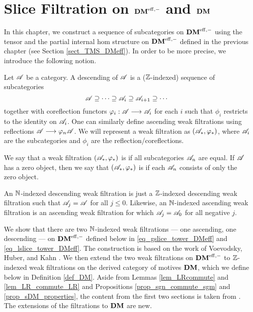 \newpage
\chapter{Slice Filtration on $\mathbf{DM}^{\mathrm{eff},-}$ and $\mathbf{DM}$}\label{sect_slice_filt_dm}

In this chapter, we construct a sequence of subcategories on 
$\mathbf{DM}^{\mathrm{eff},-}$ using the tensor and the partial internal hom structure 
on $\mathbf{DM}^{\mathrm{eff},-}$ defined in the previous chapter (see Section 
\ref{sect_TMS_DMeff}). In order to be more precise, we introduce
the following notion.

\begin{defn}\label{def_cat_filtration}
Let $\mathscr{A}$ be a category. A descending  of 
$\mathscr{A}$ is a ($\mathbb{Z}$-indexed) sequence of subcategories
\[
\mathscr{A} \supseteq \cdots \supseteq \mathscr{A}_i \supseteq \mathscr{A}_{i + 1}
   \supseteq \cdots
\]
together with coreflection functors $\varphi_i: \mathscr{A} \longrightarrow \mathscr{A}_i$
for each $i$ such that $\phi_i$ restricts to the identity on
$\mathscr{A}_i$. One can similarly define ascending weak filtrations using
reflections $\mathscr{A} \longrightarrow \varphi_n\mathscr{A}$. We will represent a weak
filtration as $(\mathscr{A}_*, \varphi_*)$, where $\mathscr{A}_i$ are the
subcategories and $\phi_i$ are the reflection/coreflections.

We say that a weak filtration $(\mathscr{A}_*, \varphi_*)$ is 
 if all subcategories $\mathscr{A}_n$ are equal. If
$\mathscr{A}$ has a zero object, then we say that $(\mathscr{A}_*, \varphi_*)$
is  if each $\mathscr{A}_n$ consists of only the zero object.
\end{defn}

\begin{rmk}
An $\mathbb{N}$-indexed descending weak filtration is just a $\mathbb{Z}$-indexed 
descending weak filtration such that $\mathscr{A}_j = \mathscr{A}$
for all $j \leq 0$. Likewise, an $\mathbb{N}$-indexed ascending 
weak filtration is an ascending weak filtration for which
$\mathscr{A}_j = \mathscr{A}_0$ for all negative $j$.
\end{rmk}

We show that there are two $\mathbb{N}$-indexed weak filtrations --- one
ascending, one descending --- on $\mathbf{DM}^{\mathrm{eff},-}$ defined below in
\eqref{eq_gslice_tower_DMeff} and \eqref{eq_lslice_tower_DMeff}. 
The construction is based on the work of Voevodsky, Huber, and 
Kahn \cite{HuKa}.  We then extend the two weak filtrations on 
$\mathbf{DM}^{\mathrm{eff},-}$ to $\mathbb{Z}$-indexed weak filtrations on the derived category 
of motives $\mathbf{DM}$, which we define below in Definition 
\ref{def_DM}. Aside from Lemmas 
\ref{lem_LRcommute} and \ref{lem_LR_commute_LR} and Propositions 
\ref{prop_sgn_commute_sgm} and \ref{prop_sDM_properties}, the 
content from the first two sections is taken from 
\cite[\S 1]{HuKa}. The extensions of the filtrations to $\mathbf{DM}$ are 
new.

